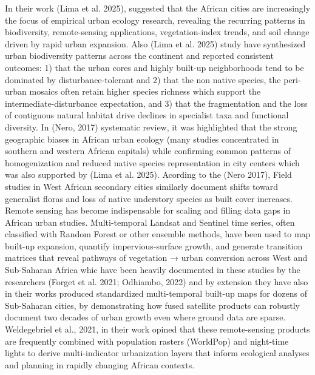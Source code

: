 In their work (Lima et al. 2025), suggested that the African cities are increasingly the focus of empirical urban ecology research, revealing the recurring patterns in biodiversity, remote-sensing applications, vegetation-index trends, and soil change driven by rapid urban expansion. Also (Lima et al. 2025) study have synthesized urban biodiversity patterns across the continent and reported consistent outcomes: 1) that the urban cores and highly built-up neighborhoods tend to be dominated by disturbance-tolerant and 2) that the non native species, the peri-urban mosaics often retain higher species richness which support the intermediate-disturbance expectation, and 3) that the fragmentation and the loss of contiguous natural habitat drive declines in specialist taxa and functional diversity. In (Nero, 2017) systematic review, it was highlighted that the strong geographic biases in African urban ecology (many studies concentrated in southern and western African capitals) while confirming common patterns of homogenization and reduced native species representation in city centers which was also supported by (Lima et al. 2025). Acording to the (Nero 2017), Field studies in West African secondary cities similarly document shifts toward generalist floras and loss of native understory species as built cover increases.
Remote sensing has become indispensable for scaling and filling data gaps in African urban studies. Multi-temporal Landsat and Sentinel time series, often classified with Random Forest or other ensemble methods, have been used to map built-up expansion, quantify impervious-surface growth, and generate transition matrices that reveal pathways of vegetation → urban conversion across West and Sub-Saharan Africa whic have been heavily documented in these studies by the researchers (Forget et al. 2021; Odhiambo, 2022) and by extension they have also in their works produced standardized multi-temporal built-up maps for dozens of Sub-Saharan cities, by demonstrating how fused satellite products can robustly document two decades of urban growth even where ground data are sparse. Weldegebriel et al., 2021, in their work opined that these remote-sensing products are frequently combined with population rasters (WorldPop) and night-time lights to derive multi-indicator urbanization layers that inform ecological analyses and planning in rapidly changing African contexts.
